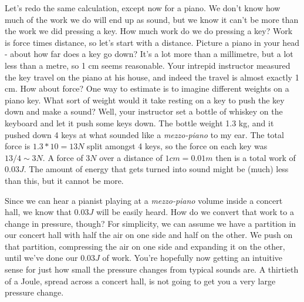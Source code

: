 \documentclass[letterpaper,11pt,preprint]{aastex}
\begin{document}
Let's redo the same calculation, except now for a piano.  We don't
know how much of the work we do will end up as sound, but we know it
can't be more than the work we did pressing a key.  How much work do
we do pressing a key?  Work is force times distance, so let's start
with a distance.  Picture a piano in your head - about how far does a
key go down?  It's a lot more than a millimetre, but a lot less than a
metre, so 1 cm seems reasonable.  Your intrepid instructor measured
the key travel on the piano at his house, and indeed the travel is
almost exactly 1 cm.  How about force?  One way to estimate is to
imagine different weights on a piano key.  What sort of weight would
it take resting on a key to push the key down and make a sound?  Well,
your instructor set a bottle of whiskey on the keyboard and let it
push some keys down.  The bottle weight 1.3 kg, and it pushed down 4
keys at what sounded like a \textit{mezzo-piano} to my ear.  The total
force is $1.3*10=13 N$ split amongst 4 keys, so the force on each key
was $13/4 \sim 3N$.  A force of $3N$ over a distance of $1cm=0.01m$
then is a total work of $0.03J$.  The amount of energy that gets
turned into sound might be (much) less than this, but it cannot be more.

Since we can hear a pianist playing at a \textit{mezzo-piano} volume
inside a concert hall, we know that $0.03J$ will be easily heard.  How
do we convert that work to a change in pressure, though?  For
simplicity, we can assume we have a partition in our concert hall with
half the air on one side and half on the other.  We push on that
partition, compressing the air on one side and expanding it on the
other, until we've done our $0.03J$ of work.  You're hopefully now
getting an intuitive sense for just how small the pressure changes
from typical sounds are.  A thirtieth of a Joule, spread across a
concert hall, is not going to get you a very large pressure change.
\end{document}
